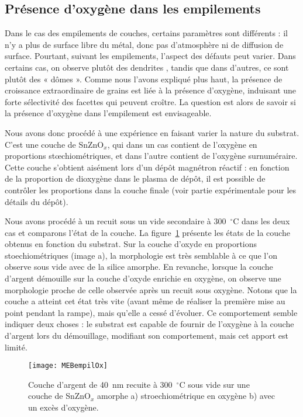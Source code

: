 \subsection{Présence d'oxygène dans les empilements}
Dans le cas des empilements de couches, certains paramètres sont différents : il n'y a plus de surface libre du métal, donc pas d'atmosphère ni de diffusion de surface. Pourtant, suivant les empilements, l'aspect des défauts peut varier. Dans certains cas, on observe plutôt des \og dendrites \fg, tandis que dans d'autres, ce sont plutôt des « dômes ». Comme nous l'avons expliqué plus haut, la présence de croissance extraordinaire de grains est liée à la présence d'oxygène, induisant une forte sélectivité des facettes qui peuvent croître. La question est alors de savoir si la présence d'oxygène dans l'empilement est envisageable.\par 
Nous avons donc procédé à une expérience en faisant varier la nature du substrat. C'est une couche de SnZnO$_x$, qui dans un cas contient de l'oxygène en proportions stœchiométriques, et dans l'autre contient de l'oxygène surnuméraire. Cette couche s'obtient aisément lors d'un dépôt magnétron réactif : en fonction de la proportion de dioxygène dans le plasma de dépôt, il est possible de contrôler les proportions dans la couche finale (voir partie expérimentale pour les détails du dépôt).\par 
Nous avons procédé à un recuit sous un vide secondaire à 300~$^\circ$C dans les deux cas et comparons l'état de la couche. La figure~\ref{MEBempilOx} présente les états de la couche obtenus en fonction du substrat. Sur la couche d'oxyde en proportions stoechiométriques (image a), la morphologie est très semblable à ce que l'on observe sous vide avec de la silice amorphe. En revanche, lorsque la couche d'argent démouille sur la couche d'oxyde enrichie en oxygène, on observe une morphologie proche de celle observée après un recuit sous oxygène. Notons que la couche a atteint cet état très vite (avant même de réaliser la première mise au point pendant la rampe), mais qu'elle a cessé d'évoluer. Ce comportement semble indiquer deux choses : le substrat est capable de fournir de l'oxygène à la couche d'argent lors du démouillage, modifiant son comportement, mais cet apport est limité.\par 
{}
\begin{figure}[!htb]
\centering
\texttt{[image: MEBempilOx]}
\caption{Couche d'argent de 40~nm recuite à 300~$^\circ$C sous vide sur une couche de SnZnO$_x$ amorphe a) stroechiométrique en oxygène b) avec un excès d'oxygène.}
\label{MEBempilOx}
\end{figure}
